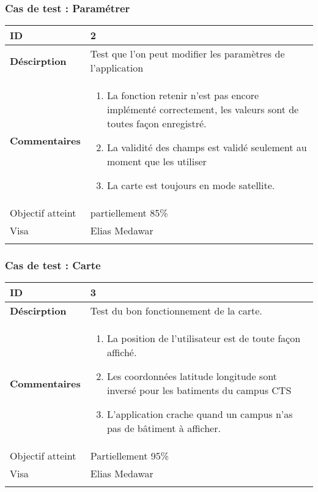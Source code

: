 		  		\subsubsection*{Cas de test : Paramétrer}
		 		 \begin{longtable}{m{4cm}|p{10cm}|}
		 		 \textbf{ ID} & 2 \\
		 		 \hline \textbf{Déscirption} & Test que l'on peut modifier les paramètres de l'application\\
		 		 \hline \textbf{Commentaires} & 
		 		 	 	 \begin{enumerate}
		 				  		\item La fonction retenir n'est pas encore implémenté correctement, les valeurs sont de toutes façon enregistré.
		 				  		\item La validité des champs est validé seulement au moment que les utiliser
		 				  		\item La carte est toujours en mode satellite.
		 				  	\end{enumerate} \\
		  				\hline Objectif atteint &  {\color{red}partiellement 85\% \XBox} \\
		  				\hline Visa & Elias Medawar 	\\
		 		 \\
		 		  \end{longtable} 		 		 
		 		 \subsubsection*{Cas de test : Carte}
		 		 		 \begin{longtable}{m{4cm}|p{10cm}|}
		 		 		 \textbf{ ID} & 3 \\
		 		 		 \hline \textbf{Déscirption} &  Test du bon fonctionnement de la carte.\\
		 		 		 \hline \textbf{Commentaires} &  
		 		 		 	 	 \begin{enumerate}
	 		 		 		 	 		\item La position de l'utilisateur est de toute façon affiché.
	 		 							\item Les coordonnées latitude longitude sont inversé pour les batiments du campus CTS
	 		 							\item {\color{red}L'application crache quand un campus n'as pas de bâtiment à afficher}.
	 		 		 		 	\end{enumerate} \\
	 		 		 		  				\hline Objectif atteint & {\color{orange} Partiellement 95\% \XBox } \\
	 		 		 		  				\hline Visa & Elias Medawar 	\\
		 		 		 \\
		 		 \end{longtable} 
